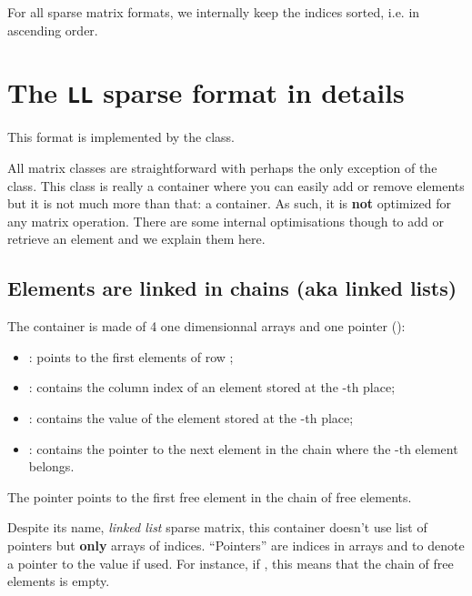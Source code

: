 \documentclass[letterpaper,10pt,english]{sphinxmanual}
\begin{document}
For all sparse matrix formats, we internally keep the indices sorted, i.e. in ascending order.


\section{The \texttt{LL} sparse format in details}
\label{sparse_matrix_formats:the-ll-sparse-format-in-details}
This format is implemented by the  class.

All matrix classes are straightforward with perhaps the only exception of the  class. This class is really a container where you can easily add or remove elements but it is not much more than that: a container. As such, it is \textbf{not} optimized for any matrix operation. There are some internal optimisations though to add or retrieve an element and we explain them here.


\subsection{Elements are linked in chains (aka linked lists)}
\label{sparse_matrix_formats:elements-are-linked-in-chains-aka-linked-lists}
The  container is made of 4 one dimensionnal arrays and one pointer ():
\begin{itemize}
\item {} 
: points to the first elements of row ;

\item {} 
: contains the column index  of an element stored at the -th place;

\item {} 
: contains the value of the element stored at the -th place;

\item {} 
: contains the pointer to the next element in the chain where the -th element belongs.

\end{itemize}

The pointer  points to the first free element in the chain of free elements.

Despite its name, \emph{linked list} sparse matrix, this container doesn't use list of pointers but \textbf{only} arrays of indices. ``Pointers'' are indices in arrays and to denote a pointer to  the value  if used. For instance, if ,
this means that the chain of free elements is empty.
\end{document}

